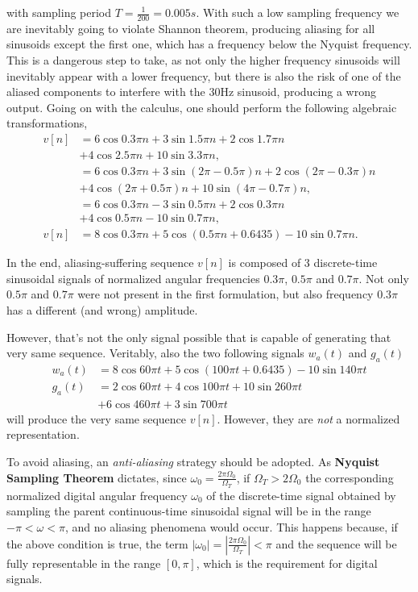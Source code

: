\documentclass[\documentfontsize, twocolumn]{\classname}
\begin{document}
with sampling period $T = \frac 1 {200} = 0.005s$. With such a low sampling frequency we are inevitably going to violate Shannon theorem, producing aliasing for all sinusoids except the first one, which has a frequency below the Nyquist frequency. This is a dangerous step to take, as not only the higher frequency sinusoids will inevitably appear with a lower frequency, but there is also the risk of one of the aliased components to interfere with the $30$Hz sinusoid, producing a wrong output.
Going on with the calculus, one should perform the following algebraic transformations,
\begin{align*}
    v[n] &= 6 \cos{0.3 \pi n} + 3 \sin{1.5 \pi n} + 2 \cos{1.7 \pi n} \\
         &+ 4 \cos{2.5 \pi n} + 10 \sin{3.3 \pi n},\\
         &= 6 \cos{0.3 \pi n} + 3 \sin{(2\pi -0.5 \pi) n} + 2 \cos{(2\pi - 0.3\pi)n} \\
         &+ 4 \cos{(2 \pi + 0.5\pi) n} + 10 \sin{(4 \pi - 0.7\pi) n},\\
         &= 6 \cos{0.3 \pi n} - 3 \sin{0.5 \pi n} + 2 \cos{0.3\pi n} \\
         &+ 4 \cos{0.5\pi n} - 10 \sin{0.7\pi n},\\
    v[n] &= 8 \cos{0.3 \pi n} + 5 \cos{(0.5 \pi n + 0.6435)} - 10 \sin{0.7\pi n}.
\end{align*}

In the end, aliasing-suffering sequence $v[n]$ is composed of 3 discrete-time sinusoidal signals of normalized angular frequencies $0.3\pi$, $0.5\pi$ and $0.7\pi$. Not only $0.5\pi$ and $0.7\pi$ were not present in the first formulation, but also frequency $0.3\pi$ has a different (and wrong) amplitude.

However, that's not the only signal possible that is capable of generating that very same sequence. Veritably, also the two following signals $w_a(t)$ and $g_a(t)$
\begin{align*}
    w_a(t) &= 8 \cos{60 \pi t} + 5\cos{(100 \pi t + 0.6435)} - 10\sin {140\pi t}\\
    g_a(t) &= 2 \cos{60 \pi t} + 4\cos{100 \pi t} + 10\sin {260\pi t}\\
           &+ 6\cos{460\pi t} + 3 \sin{700\pi t}
\end{align*}
will produce the very same sequence $v[n]$.
However, they are \emph{not} a normalized representation.

To avoid aliasing, an \emph{anti-aliasing} strategy should be adopted. As \textbf{Nyquist Sampling Theorem} dictates, since $\omega_0 = \frac{2\pi \Omega_0}{\Omega_T}$, if $\Omega_T > 2\Omega_0$ the corresponding normalized digital angular frequency $\omega_0$ of the discrete-time signal obtained by sampling the parent continuous-time sinusoidal signal will be in the range $-\pi < \omega < \pi$, and no aliasing phenomena would occur.
This happens because, if the above condition is true, the term $|\omega_0| = \left|\frac{2\pi \Omega_0}{\Omega_T}\right| < \pi$ and the sequence will be fully representable in the range $[0, \pi]$, which is the requirement for digital signals.
\end{document}
